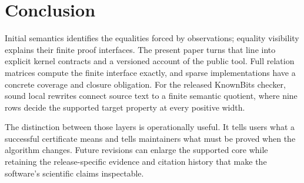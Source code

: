 \section{Conclusion}
Initial semantics identifies the equalities forced by observations; equality visibility explains their finite proof interfaces. The present paper turns that line into explicit kernel contracts and a versioned account of the public tool. Full relation matrices compute the finite interface exactly, and sparse implementations have a concrete coverage and closure obligation. For the released KnownBits checker, sound local rewrites connect source text to a finite semantic quotient, where nine rows decide the supported target property at every positive width.

The distinction between those layers is operationally useful. It tells users what a successful certificate means and tells maintainers what must be proved when the algorithm changes. Future revisions can enlarge the supported core while retaining the release-specific evidence and citation history that make the software's scientific claims inspectable.
